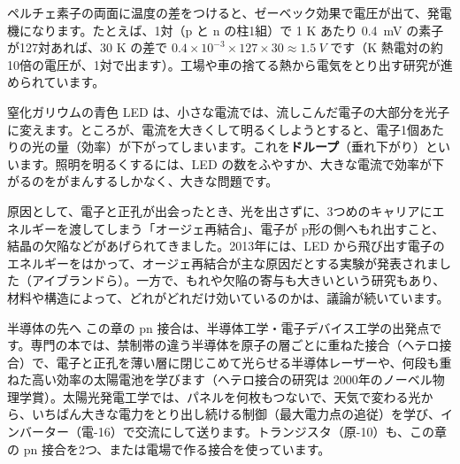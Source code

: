 ペルチェ素子の両面に温度の差をつけると、ゼーベック効果で電圧が出て、発電機になります。たとえば、1対（p と n の柱1組）で 1 K あたり \qty{0.4}{mV} の素子が127対あれば、30 K の差で $0.4\times10^{-3}\times127\times30\approx\qty{1.5}{V}$ です（K 熱電対の約10倍の電圧が、1対で出ます）。工場や車の捨てる熱から電気をとり出す研究が進められています。

\begin{phmada}
窒化ガリウムの青色 LED は、小さな電流では、流しこんだ電子の大部分を光子に変えます。ところが、電流を大きくして明るくしようとすると、電子1個あたりの光の量（効率）が下がってしまいます。これを\textbf{ドループ}（垂れ下がり）といいます。照明を明るくするには、LED の数をふやすか、大きな電流で効率が下がるのをがまんするしかなく、大きな問題です。

原因として、電子と正孔が出会ったとき、光を出さずに、3つめのキャリアにエネルギーを渡してしまう「オージェ再結合」、電子が p形の側へもれ出すこと、結晶の欠陥などがあげられてきました。2013年には、LED から飛び出す電子のエネルギーをはかって、オージェ再結合が主な原因だとする実験が発表されました（アイブランドら）。一方で、もれや欠陥の寄与も大きいという研究もあり、材料や構造によって、どれがどれだけ効いているのかは、議論が続いています。
\end{phmada}

\begin{phsaki}{半導体の先へ}
この章の pn 接合は、半導体工学・電子デバイス工学の出発点です。専門の本では、禁制帯の違う半導体を原子の層ごとに重ねた接合（ヘテロ接合）で、電子と正孔を薄い層に閉じこめて光らせる半導体レーザーや、何段も重ねた高い効率の太陽電池を学びます（ヘテロ接合の研究は 2000年のノーベル物理学賞）。太陽光発電工学では、パネルを何枚もつないで、天気で変わる光から、いちばん大きな電力をとり出し続ける制御（最大電力点の追従）を学び、インバーター（電-16）で交流にして送ります。トランジスタ（原-10）も、この章の pn 接合を2つ、または電場で作る接合を使っています。
\end{phsaki}


